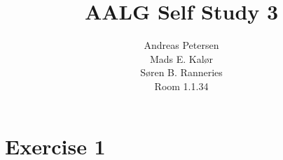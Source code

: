 \documentclass[koma,a4paper]{article}
\title{AALG Self Study 3}
\author{Andreas Petersen\\
Mads E. Kalør\\
Søren B. Ranneries\\
Room 1.1.34}
\begin{document}
\maketitle

\pagebreak

\section{Exercise 1}
\end{document}
